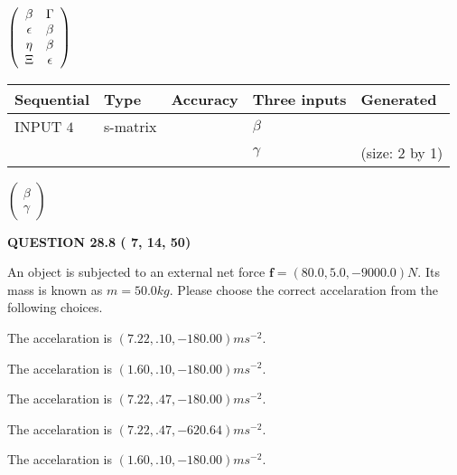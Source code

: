 \documentclass[12pt]{article}
\begin{document}
   
 $  \left( \begin{array}
 {
 c
 c
 }
 \beta & 
 \Gamma \\ 
 \epsilon & 
 \beta \\ 
 \eta & 
 \beta \\ 
                    \Xi & 
 \epsilon
 \end{array} \right) $ 
  
  
\noindent\begin{tabular}{|l|l|l|l|l|}
\hline
 Sequential & Type & Accuracy & Three inputs & Generated \\ 
\hline
 
 
  INPUT $           4$ & s-matrix & & 
 $  \beta $ & 
  \\
  & & & 
 $  \gamma $ & 
  (size:           2 by           1)
 \\  \hline  
 \end{tabular}
   
   
 $  \left( \begin{array}
 {
 c
 }
 \beta \\ 
 \gamma
 \end{array} \right) $ 
  
\vspace{0.2in}
  
{\textbf{\Large{QUESTION
28.8 
 (          7,         14,         50)
}}}
  
  
 
An object is subjected to an external net force $\mathbf{f}=
(80.0 , 5.0 , -9000.0) N$.
Its mass is known as $m= %
50.0 kg$.
Please choose the correct accelaration from the following choices.
 
 
  The accelaration is $  %
(
7.22,
.10,
-180.00)
ms^{-2} $.
 
 
  The accelaration is $  %
(
1.60,
.10,
-180.00)
ms^{-2} $.
 
 
  The accelaration is $  %
(
7.22,
.47,
-180.00)
ms^{-2} $.
 
 
  The accelaration is $  %
(
7.22,
.47,
-620.64)
ms^{-2} $.
 
 
\noindent{}
 
 
  The accelaration is $  %
(
1.60,
.10,
-180.00)
ms^{-2} $.
 
 
\noindent{}
 
\end{document}

